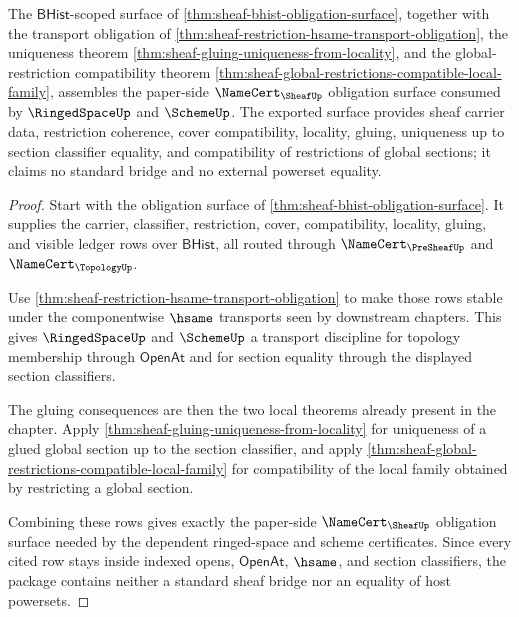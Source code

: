 \begin{theorem}
\label{thm:sheaf-cover-gluing-namecert-export}
The $\mathsf{BHist}$-scoped surface of \autoref{thm:sheaf-bhist-obligation-surface}, together with the transport obligation of \autoref{thm:sheaf-restriction-hsame-transport-obligation}, the uniqueness theorem \autoref{thm:sheaf-gluing-uniqueness-from-locality}, and the global-restriction compatibility theorem \autoref{thm:sheaf-global-restrictions-compatible-local-family}, assembles the paper-side $\NameCert_{\SheafUp}$ obligation surface consumed by $\RingedSpaceUp$ and $\SchemeUp$. The exported surface provides sheaf carrier data, restriction coherence, cover compatibility, locality, gluing, uniqueness up to section classifier equality, and compatibility of restrictions of global sections; it claims no standard bridge and no external powerset equality.
\end{theorem}
\begin{proof}
Start with the obligation surface of \autoref{thm:sheaf-bhist-obligation-surface}. It supplies the carrier, classifier, restriction, cover, compatibility, locality, gluing, and visible ledger rows over $\mathsf{BHist}$, all routed through $\NameCert_{\PreSheafUp}$ and $\NameCert_{\TopologyUp}$.

Use \autoref{thm:sheaf-restriction-hsame-transport-obligation} to make those rows stable under the componentwise $\hsame$ transports seen by downstream chapters. This gives $\RingedSpaceUp$ and $\SchemeUp$ a transport discipline for topology membership through $\mathsf{OpenAt}$ and for section equality through the displayed section classifiers.

The gluing consequences are then the two local theorems already present in the chapter. Apply \autoref{thm:sheaf-gluing-uniqueness-from-locality} for uniqueness of a glued global section up to the section classifier, and apply \autoref{thm:sheaf-global-restrictions-compatible-local-family} for compatibility of the local family obtained by restricting a global section.

Combining these rows gives exactly the paper-side $\NameCert_{\SheafUp}$ obligation surface needed by the dependent ringed-space and scheme certificates. Since every cited row stays inside indexed opens, $\mathsf{OpenAt}$, $\hsame$, and section classifiers, the package contains neither a standard sheaf bridge nor an equality of host powersets.
\end{proof}


